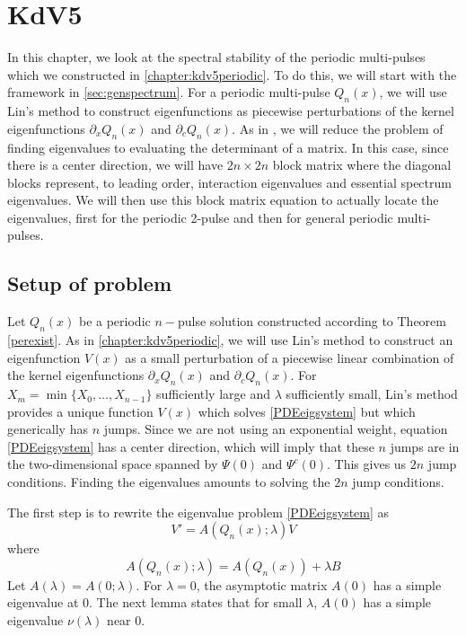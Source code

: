 \documentclass[thesis.tex]{subfiles}
\begin{document}
\iffulldocument\else
	\chapter{KdV5}
\fi

In this chapter, we look at the spectral stability of the periodic multi-pulses which we constructed in \cref{chapter:kdv5periodic}. To do this, we will start with the framework in \cref{sec:genspectrum}. For a periodic multi-pulse $Q_n(x)$, we will use Lin's method to construct eigenfunctions as piecewise perturbations of the kernel eigenfunctions $\partial_x Q_n(x)$ and $\partial_c Q_n(x)$. As in \cite{Sandstede1998}, we will reduce the problem of finding eigenvalues to evaluating the determinant of a matrix. In this case, since there is a center direction, we will have $2n \times 2n$ block matrix where the diagonal blocks represent, to leading order, interaction eigenvalues and essential spectrum eigenvalues. We will then use this block matrix equation to actually locate the eigenvalues, first for the periodic 2-pulse and then for general periodic multi-pulses.

\section{Setup of problem}

Let $Q_n(x)$ be a periodic $n-$pulse solution constructed according to Theorem \ref{perexist}. As in \cref{chapter:kdv5periodic}, we will use Lin's method to construct an eigenfunction $V(x)$ as a small perturbation of a piecewise linear combination of the kernel eigenfunctions $\partial_x Q_n(x)$ and $\partial_c Q_n(x)$. For $X_m = \min\{X_0, \dots, X_{n-1} \}$ sufficiently large and $\lambda$ sufficiently small, Lin's method provides a unique function $V(x)$ which solves \cref{PDEeigsystem} but which generically has $n$ jumps. Since we are not using an exponential weight, equation \cref{PDEeigsystem} has a center direction, which will imply that these $n$ jumps are in the two-dimensional space spanned by $\Psi(0)$ and $\Psi^c(0)$. This gives us $2n$ jump conditions. Finding the eigenvalues amounts to solving the $2n$ jump conditions.
 
The first step is to rewrite the eigenvalue problem \cref{PDEeigsystem} as
\begin{equation}\label{PDEeig3}
V' = A(Q_n(x); \lambda)V 
\end{equation} 
where 
\begin{equation}
A(Q_n(x); \lambda) = A(Q_n(x)) + \lambda B
\end{equation}
Let $A(\lambda) = A(0; \lambda)$. For $\lambda = 0$, the asymptotic matrix $A(0)$ has a simple eigenvalue at 0. The next lemma states that for small $\lambda$, $A(0)$ has a simple eigenvalue $\nu(\lambda)$ near 0.
\end{document}
